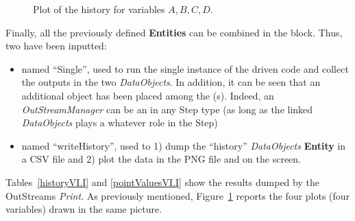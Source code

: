\begin{enumerate}
\begin{figure}[h!]
  \caption{Plot of the history for variables $A,B,C,D$.}
  \label{fig:historyPlotLine}
 \end{figure}
   Finally, all the previously defined \textbf{Entities} can be combined in the  block. Thus, 
   two  have been inputted:
   \begin{itemize}
     \item {} named ``Single'', used to run the single instance of the driven code and collect 
     the outputs in the two \textit{DataObjects}. In addition, it can be seen that an additional object has been  
     placed among the (s). Indeed, an  \textit{OutStreamManager} can be an  in 
     any Step type (as long as the linked \textit{DataObjects} plays a whatever role in the Step)
     \item  {} named ``writeHistory'', used to 1) dump the ``history'' \textit{DataObjects} 
     \textbf{Entity} in a CSV file and 2) plot the data in the PNG file and on the screen.
   \end{itemize}
\end{enumerate} 
 Tables~\ref{historyVI.I} and \ref{pointValuesVI.I} show the results dumped by the OutStreams \textit{Print}.
 As previously mentioned, Figure~\ref{fig:historyPlotLine} reports the four plots (four variables) drawn in the same picture. 
